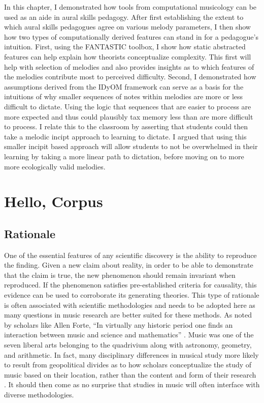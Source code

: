 \documentclass[12pt,]{book}
\begin{document}
In this chapter, I demonstrated how tools from computational musicology can be used as an aide in aural skills pedagogy.
After first establishing the extent to which aural skills pedagogues agree on various melody parameters, I then show how two types of computationally derived features can stand in for a pedagogue's intuition.
First, using the FANTASTIC toolbox, I show how static abstracted features can help explain how theorists conceptualize complexity.
This first will help with selection of melodies and also provides insights as to which features of the melodies contribute most to perceived difficulty.
Second, I demonstrated how assumptions derived from the IDyOM framework can serve as a basis for the intuitions of why smaller sequences of notes within melodies are more or less difficult to dictate.
Using the logic that sequences that are easier to process are more expected and thus could plausibly tax memory less than are more difficult to process.
I relate this to the classroom by asserting that students could then take a melodic incipt approach to learning to dictate.
I argued that using this smaller incipit based approach will allow students to not be overwhelmed in their learning by taking a more linear path to dictation, before moving on to more more ecologically valid melodies.

\clearpage

\hypertarget{chapterfour}{%
\chapter{Hello, Corpus}\label{chapterfour}}

\hypertarget{rationale-3}{%
\section{Rationale}\label{rationale-3}}

One of the essential features of any scientific discovery is the ability to reproduce the finding.
Given a new claim about reality, in order to be able to demonstrate that the claim is true, the new phenomenon should remain invariant when reproduced.
If the phenomenon satisfies pre-established criteria for causality, this evidence can be used to corroborate its generating theories.
This type of rationale is often associated with scientific methodologies and needs to be adopted here as many questions in music research are better suited for these methods.
As noted by scholars like Allen Forte, ``In virtually any historic period one finds an interaction between music and science and mathematics'' \citep{forteMusicComputingPresent1967}.
Music was one of the seven liberal arts belonging to the quadrivium along with astronomy, geometry, and arithmetic.
In fact, many disciplinary differences in musical study more likely to result from geopolitical divides as to how scholars conceptualize the study of music based on their location, rather than the content and form of their research \citep{parncuttSystematicMusicologyHistory2007}.
It should then come as no surprise that studies in music will often interface with diverse methodologies.
\end{document}
